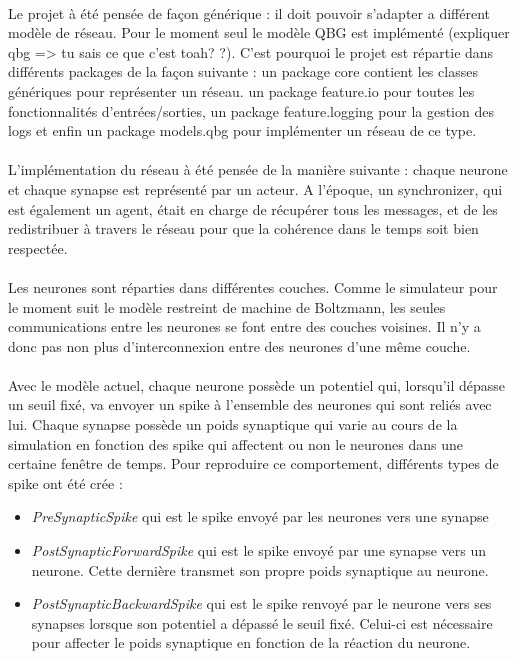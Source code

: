 \documentclass[a4paper,10pt]{article}
\begin{document}
\paragraph{}
Le projet à été pensée de façon générique : il doit pouvoir s’adapter a différent modèle de réseau. Pour le moment seul le modèle QBG est implémenté (expliquer qbg => tu sais ce que c’est toah? ?). C’est pourquoi le projet est répartie dans différents packages de la façon suivante : un package core contient les classes génériques pour représenter un réseau. un package feature.io pour toutes les fonctionnalités d’entrées/sorties, un package feature.logging pour la gestion des logs et enfin un package models.qbg pour implémenter un réseau de ce type.

\paragraph{}
L’implémentation du réseau à été pensée de la manière suivante : chaque neurone et chaque synapse est représenté par un acteur. A l’époque, un synchronizer, qui est également  un agent, était en charge de récupérer tous les messages, et de les redistribuer à travers le réseau pour que la cohérence dans le temps soit bien respectée. 

\paragraph{}
Les neurones sont réparties dans différentes couches. Comme le simulateur pour le moment suit le modèle restreint de machine de Boltzmann, les seules communications entre les neurones se font entre des couches voisines. Il n'y a donc pas non plus d’interconnexion entre des neurones d'une même couche.

\paragraph{}
Avec le modèle actuel, chaque neurone possède un potentiel qui, lorsqu'il dépasse un seuil fixé, va envoyer un spike à l'ensemble des neurones qui sont reliés avec lui. Chaque synapse possède un poids synaptique qui varie au cours de la simulation en fonction des spike qui affectent ou non le neurones dans une certaine fenêtre de temps. Pour reproduire ce comportement, différents types de spike ont été crée : 
\begin{itemize}
\item \emph{PreSynapticSpike} qui est le spike envoyé par les neurones vers une synapse
\item \emph{PostSynapticForwardSpike} qui est le spike envoyé par une synapse vers un neurone. Cette dernière transmet son propre poids synaptique au neurone.
\item \emph{PostSynapticBackwardSpike} qui est le spike renvoyé par le neurone vers ses synapses lorsque son potentiel a dépassé le seuil fixé. Celui-ci est nécessaire pour affecter le poids synaptique en fonction de la réaction du neurone.
\end{itemize}
\end{document}

